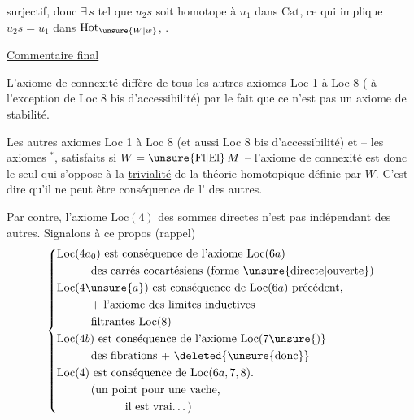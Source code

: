 surjectif, donc $\exists\,s$ tel que $u_2s$ soit homotope à $u_1$ dans $\mathrm{Cat}$, ce qui implique $u_2s=u_1$ dans $\mathrm{Hot}_{\unsure{W|w}}$, .

\uline{Commentaire final}

L'axiome de connexité diffère de tous les autres axiomes Loc 1 à Loc 8 ( à l'exception de Loc 8 bis d'accessibilité) par le fait que ce n'est pas un axiome de stabilité.

Les autres axiomes Loc 1 à Loc 8 (et aussi Loc 8 bis d'accessibilité) et -- les axiomes  $^{\ast}$,  satisfaits si $W=\unsure{\mathrm{Fl}|\mathrm{El}}\,M$ -- l'axiome de connexité est donc le seul qui s'oppose à la \uline{trivialité} de la théorie homotopique définie par $W$. C'est dire qu'il ne peut être conséquence de l' des autres.

Par contre, l'axiome $\mathrm{Loc}(4)$ des sommes directes n'est pas indépendant des autres. Signalons à ce propos (rappel)
\[
\left\{\begin{aligned}
&\mathrm{Loc}(4a_0)\ \text{est conséquence de l'axiome $\mathrm{Loc}(6a)$}\\
&\hspace{3em}\text{des carrés cocartésiens (forme \unsure{directe|ouverte})}\\
&\mathrm{Loc}(4\unsure{a})\ \text{est conséquence de $\mathrm{Loc}(6a)$ précédent,}\\
&\hspace{3em}\text{$+$ l'axiome des limites inductives}\\
&\hspace{3em}\text{filtrantes $\mathrm{Loc}(8)$}\\
&\mathrm{Loc}(4b)\ \text{est conséquence de l'axiome $\mathrm{Loc}(7\unsure{)}$}\\
&\hspace{3em}\text{des fibrations $+$ \deleted{\unsure{donc}}}\\
&\mathrm{Loc}(4)\ \text{est conséquence de $\mathrm{Loc}(6a,7,8)$.}\\
&\hspace{3em}\text{(un point pour une vache,}\\
&\hspace{6em}\text{il est vrai\ldots)}
\end{aligned}\right.
\]

